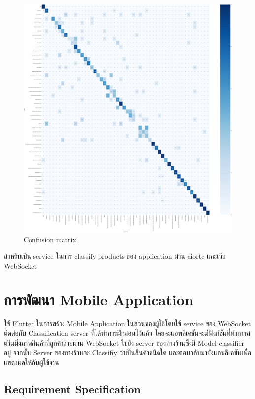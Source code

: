   \begin{figure}[h]
    \begin{center}
    
    \includegraphics[scale=0.12]{pic/blind_pic_4_ccm.png}
    \end{center}
    
    \caption[Confusion matrix]{Confusion matrix}
    \label{fig:Confusion matrix}
    \end{figure}
   สำหรับเป็น service ในการ classify products ของ application ผ่าน aiortc  และเว็บ WebSocket

 
 
\newpage

\section{การพัฒนา Mobile Application}
ใช้ Flutter ในการสร้าง Mobile Application ในส่วนของผู้ใช้โดยใช้ service ของ WebSocket ติดต่อกับ Classification server ที่ได้ทำการฝึกสอนไว้แล้ว
โดยจะแอพลิเคชันจะมีฟังก์ชันที่ทำการสตรีมมิ่งภาพสินค้าที่ลูกค้าถ่ายผ่าน WebSocket ไปยัง server ของทางร้านซึ่งมี Model classifier อยู่
จากนั้น Server ของทางร้านจะ Classifiy ว่าเป็นสินค้าชนิดใด และตอบกลับมายังแอพลิเคชันเพื่อแสดงผลให้กับผู้ใช้งาน
\subsection{Requirement Specification}  

